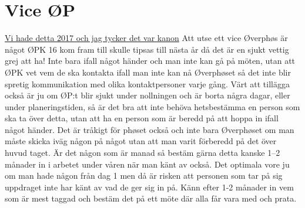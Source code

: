 \documentclass[10pt]{article}
\begin{document}
    \section{Vice ØP}
    \underline{Vi hade detta 2017 och jag tycker det var kanon} \newline
    Att utse ett vice Øverphøs är något ØPK 16 kom fram till skulle tipsas till nästa år då det är en sjukt vettig grej att ha! Inte bara ifall något händer och man inte kan gå på möten, utan att ØPK vet vem de ska kontakta ifall man inte kan nå Øverphøset så det inte blir spretig kommunikation med olika kontaktpersoner varje gång. Värt att tillägga också är ju om ØP:t blir sjukt under nollningen och är borta några dagar, eller under planeringstiden, så är det bra att inte behöva hetsbestämma en person som ska ta över detta, utan att ha en person som är beredd på att hoppa in ifall något händer. Det är tråkigt för phøset också och inte bara Øverphøset om man måste skicka iväg någon på något utan att man varit förberedd på det över huvud taget. Är det någon som är manad så bestäm gärna detta kanske 1–2 månader in i arbetet under våren när man känt av också. Det optimala vore ju om man hade någon från dag 1 men då är risken att personen som tar på sig uppdraget inte har känt av vad de ger sig in på. Känn efter 1-2 månader in vem som är mest taggad och bestäm det på ett möte där alla får vara med och prata.
\end{document}
